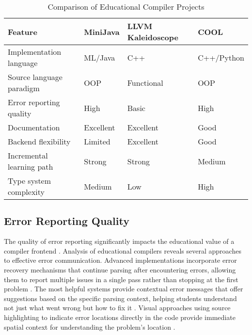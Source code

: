 \begin{table}[ht!]
    \centering
    \label{tab:edu-compiler-comparison}
    \begin{tabularx}{\textwidth}{|
        >{\raggedright\arraybackslash}p{2.5cm}|
        >{\centering\arraybackslash}X|
        >{\centering\arraybackslash}X|
        >{\centering\arraybackslash}X|
      }
      \hline
      \textbf{Feature} & \textbf{MiniJava} & \textbf{LLVM Kaleidoscope} & \textbf{COOL} \\
      \hline
      Implementation language     & ML/Java       & C++              & C++/Python         \\
      \hline
      Source language paradigm    & OOP           & Functional       & OOP                \\
      \hline
      Error reporting quality     & High          & Basic            & High               \\
      \hline
      Documentation              & Excellent     & Excellent        & Good               \\
      \hline
      Backend flexibility        & Limited       & Excellent        & Good               \\
      \hline
      Incremental learning path  & Strong        & Strong           & Medium             \\
      \hline
      Type system complexity     & Medium        & Low              & High               \\
      \hline
    \end{tabularx}
    \caption{Comparison of Educational Compiler Projects}
\end{table}


\subsection{Error Reporting Quality}

The quality of error reporting significantly impacts the educational value of a compiler frontend \cite{traver2010compiler}. Analysis of educational compilers reveals several approaches to effective error communication. Advanced implementations incorporate error recovery mechanisms that continue parsing after encountering errors, allowing them to report multiple issues in a single pass rather than stopping at the first problem \cite{aho2007compilers}. The most helpful systems provide contextual error messages that offer suggestions based on the specific parsing context, helping students understand not just what went wrong but how to fix it \cite{traver2010compiler}. Visual approaches using source highlighting to indicate error locations directly in the code provide immediate spatial context for understanding the problem's location \cite{horwitz2007student}.

